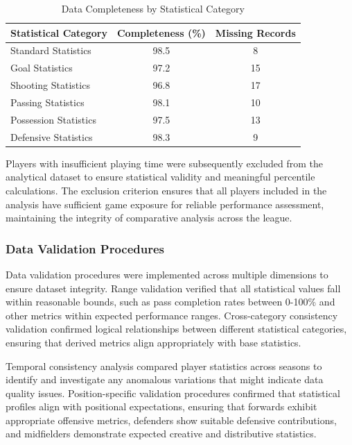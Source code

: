 \begin{table}[h]
\centering
\caption{Data Completeness by Statistical Category}
\label{tab:data_completeness}
\begin{tabular}{lcc}
\toprule
\textbf{Statistical Category} & \textbf{Completeness (\%)} & \textbf{Missing Records} \\
\midrule
Standard Statistics & 98.5 & 8 \\
Goal Statistics & 97.2 & 15 \\
Shooting Statistics & 96.8 & 17 \\
Passing Statistics & 98.1 & 10 \\
Possession Statistics & 97.5 & 13 \\
Defensive Statistics & 98.3 & 9 \\
\bottomrule
\end{tabular}
\end{table}

Players with insufficient playing time were subsequently excluded from the analytical dataset to ensure statistical validity and meaningful percentile calculations. The exclusion criterion ensures that all players included in the analysis have sufficient game exposure for reliable performance assessment, maintaining the integrity of comparative analysis across the league.

\subsubsection{Data Validation Procedures}

Data validation procedures were implemented across multiple dimensions to ensure dataset integrity. Range validation verified that all statistical values fall within reasonable bounds, such as pass completion rates between 0-100\% and other metrics within expected performance ranges. Cross-category consistency validation confirmed logical relationships between different statistical categories, ensuring that derived metrics align appropriately with base statistics.

Temporal consistency analysis compared player statistics across seasons to identify and investigate any anomalous variations that might indicate data quality issues. Position-specific validation procedures confirmed that statistical profiles align with positional expectations, ensuring that forwards exhibit appropriate offensive metrics, defenders show suitable defensive contributions, and midfielders demonstrate expected creative and distributive statistics.

